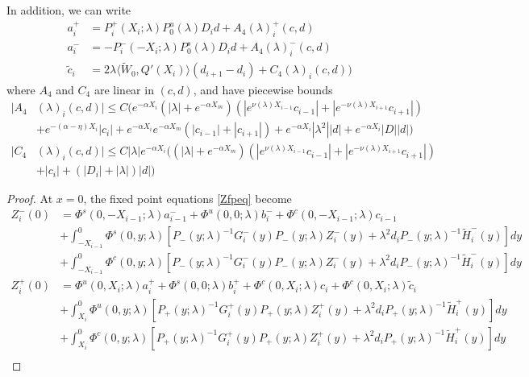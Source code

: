 \documentclass[thesis.tex]{subfiles}
\begin{document}
\begin{lemma}
In addition, we can write
\begin{align*}
a_i^+ &= P_i^+(X_i; \lambda) P_0^u(\lambda) D_i d + A_4(\lambda)_i^+(c, d) \\
a_i^- &= -P_i^-(-X_i; \lambda) P_0^s(\lambda) D_i d + A_4(\lambda)_i^-(c, d) \\
\tilde{c}_i &= 2 \lambda \langle \tilde{W}_0, Q'(X_i) \rangle (d_{i+1} - d_i ) + C_4(\lambda)_i(c, d) )
\end{align*}
where $A_4$ and $C_4$ are linear in $(c, d)$, and have piecewise bounds
\begin{align}
|A_4&(\lambda)_i(c, d)|
\leq C \Big(  
e^{-\alpha X_i} (|\lambda| + e^{-\alpha X_m})(|e^{\nu(\lambda)X_{i-1}} c_{i-1}| + |e^{-\nu(\lambda)X_{i+1}}c_{i+1}|) \nonumber \\
&+ e^{-(\alpha - \eta)X_i}|c_i| + e^{-\alpha X_i} e^{-\alpha X_m}(|c_{i-1}| + |c_{i+1}|) + e^{-\alpha X_i} |\lambda^2||d| + e^{-\alpha X_i}|D||d| \Big) \label{A4bound} \\
|C_4&(\lambda)_i(c, d)| \leq C |\lambda| e^{-\alpha X_i} \Big( (|\lambda| + e^{-\alpha X_m})(|e^{\nu(\lambda)X_{i-1}} c_{i-1}| + |e^{-\nu(\lambda)X_{i+1}}c_{i+1}|) \nonumber \\
&+ |c_i| + (|D_i| + |\lambda|)|d| \Big) \label{C4bound}
\end{align}

\begin{proof}
At $x = 0$, the fixed point equations \eqref{Zfpeq} become
\begin{align*}
Z_i^-(0) &= \Phi^s(0, -X_{i-1}; \lambda) a_{i-1}^- + \Phi^u(0, 0; \lambda) b_i^- + \Phi^c(0, -X_{i-1}; \lambda) c_{i-1} \\
&+ \int_{-X_{i-1}}^0 \Phi^s(0, y; \lambda)[P_-(y; \lambda)^{-1} G_i^-(y) P_-(y; \lambda)Z_i^-(y) + \lambda^2 d_i P_-(y; \lambda)^{-1} \tilde{H}_i^-(y)] dy \\
&+ \int_{-X_{i-1}}^0 \Phi^c(0, y; \lambda) [P_-(y; \lambda)^{-1} G_i^-(y) P_-(y; \lambda)Z_i^-(y) + \lambda^2 d_i P_-(y; \lambda)^{-1} \tilde{H}_i^-(y)] dy \\ 
Z_i^+(0) &= \Phi^u(0, X_i; \lambda) a_i^+ + \Phi^s(0, 0; \lambda) b_i^+ + \Phi^c(0, X_i; \lambda) c_i + \Phi^c(0, X_i; \lambda) \tilde{c}_i \\
&+ \int_{X_i}^0 \Phi^u(0, y; \lambda) [P_+(y; \lambda)^{-1} G_i^+(y) P_+(y; \lambda) Z_i^+(y) + \lambda^2 d_i P_+(y; \lambda)^{-1} \tilde{H}_i^+(y)] dy \\
&+ \int_{X_i}^0 \Phi^c(0, y; \lambda) [P_+(y; \lambda)^{-1} G_i^+(y) P_+(y; \lambda) Z_i^+(y) + \lambda^2 d_i P_+(y; \lambda)^{-1} \tilde{H}_i^+(y)] dy \\
\end{align*}


\end{proof}
\end{lemma}
\end{document}
